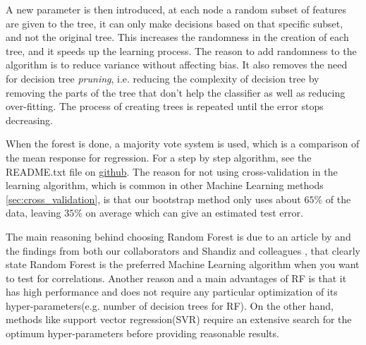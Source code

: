 A new parameter is then introduced, at each node a random subset of features are given to the tree, it can only make decisions based on that specific subset, and not the original tree. This increases the randomness in the creation of each tree, and it speeds up the learning process. The reason to add randomness to the algorithm is to reduce variance without affecting bias. It also removes the need for decision tree \textit{pruning}, i.e. reducing the complexity of decision tree by removing the parts of the tree that don't help the classifier as well as reducing over-fitting. The process of creating trees is repeated until the error stops decreasing.

When the forest is done, a majority vote system is used, which is a comparison of the mean response for regression. For a step by step algorithm, see the README.txt file on \href{https://github.com/sondrt/Machine-Learning-the-Voltage-Capacity-and-Energy-density-of-Electrode-Materials}{github}.
The reason for not using cross-validation in the learning algorithm, which is common in other Machine Learning methods \ref{sec:cross_validation}, is that our bootstrap method only uses about $65\%$ of the data, leaving $35\%$ on average which can give an estimated test error.

The main reasoning behind choosing Random Forest is due to an article by \cite{fernandez2014we} and the findings from both our collaborators \cite{tsamardinos2020automated} and Shandiz and colleagues \cite{shandiz2016application}, that clearly state Random Forest is the preferred Machine Learning algorithm when you want to test for correlations. Another reason and a main advantages of RF is that it has high performance and does not require any particular optimization of its hyper-parameters(e.g. number of decision trees for RF). On the other hand, methods like support vector regression(SVR) require an extensive search for the optimum hyper-parameters before providing reasonable results.

	
